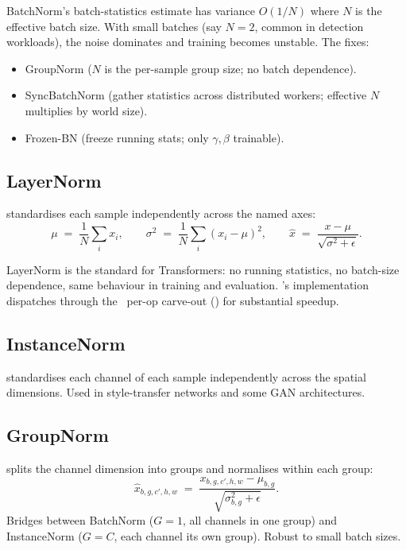 BatchNorm's batch-statistics estimate has variance $O(1/N)$
where $N$ is the effective batch size. With small batches
(say $N = 2$, common in detection workloads), the noise
dominates and training becomes unstable. The fixes:

\begin{itemize}
  \item GroupNorm ($N$ is the per-sample group size; no batch
    dependence).
  \item SyncBatchNorm (gather statistics across distributed
    workers; effective $N$ multiplies by world size).
  \item Frozen-BN (freeze running stats; only $\gamma, \beta$
    trainable).
\end{itemize}

\subsection{LayerNorm}
\label{ssec:linear_conv_norm:layernorm}

 \cite{ba_layernorm_2016}
standardises each sample independently across the named axes:
\[
\mu \;=\; \frac{1}{N} \sum_i x_i, \qquad
\sigma^2 \;=\; \frac{1}{N} \sum_i (x_i - \mu)^2,
\qquad
\hat x \;=\; \frac{x - \mu}{\sqrt{\sigma^2 + \epsilon}}.
\]

LayerNorm is the standard for Transformers: no running statistics,
no batch-size dependence, same behaviour in training and
evaluation. \Lucid's implementation dispatches through the
\MPSGraph\ per-op carve-out
() for substantial speedup.

\subsection{InstanceNorm}
\label{ssec:linear_conv_norm:instancenorm}

 \cite{ulyanov_instancenorm_2016}
standardises each channel of each sample independently across the
spatial dimensions. Used in style-transfer networks and some GAN
architectures.

\subsection{GroupNorm}
\label{ssec:linear_conv_norm:groupnorm}

 \cite{wu_groupnorm_2018}
splits the channel dimension into groups and normalises within each
group:
\[
\hat x_{b, g, c', h, w} \;=\; \frac{x_{b, g, c', h, w} - \mu_{b, g}}{\sqrt{\sigma_{b, g}^2 + \epsilon}}.
\]
Bridges between BatchNorm ($G = 1$, all channels in one group) and
InstanceNorm ($G = C$, each channel its own group). Robust to
small batch sizes.


